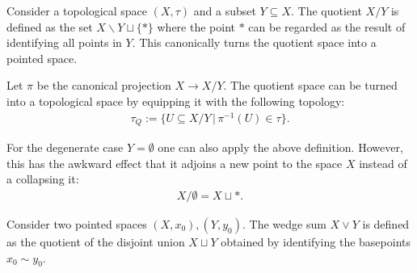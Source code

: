     \begin{construct}\label{topology:quotient_space}
        Consider a topological space $(X,\tau)$ and a subset $Y\subseteq X$. The quotient $X/Y$ is defined as the set $X\backslash Y\sqcup\{\ast\}$ where the point $\ast$ can be regarded as the result of identifying all points in $Y$. This canonically turns the quotient space into a pointed space.

        Let $\pi$ be the canonical projection $X\rightarrow X/Y$. The quotient space can be turned into a topological space by equipping it with the following topology:
        \begin{gather}
            \tau_Q := \big\{U\subseteq X/Y\,\big\vert\,\pi^{-1}(U)\in\tau\big\}.
        \end{gather}
    \end{construct}
    \begin{remark}
        For the degenerate case $Y=\emptyset$ one can also apply the above definition. However, this has the awkward effect that it adjoins a new point to the space $X$ instead of a collapsing it:
        \begin{gather}
            \label{topology:empty_quotient}
            X/\emptyset = X\sqcup\ast.
        \end{gather}
    \end{remark}

    \begin{construct}
        Consider two pointed spaces $(X,x_0),(Y,y_0)$. The wedge sum $X\vee Y$ is defined as the quotient of the disjoint union $X\sqcup Y$ obtained by identifying the basepoints $x_0\sim y_0$.
    \end{construct}

